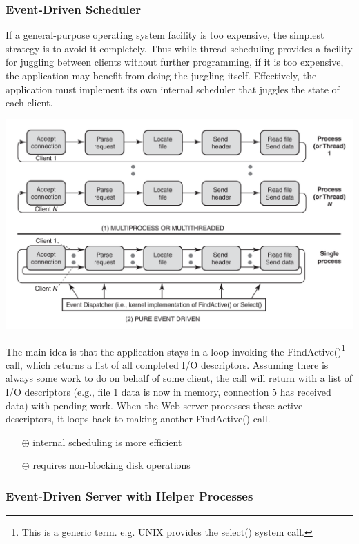 \subsubsection{Event-Driven Scheduler}

If a general-purpose operating system facility is too expensive, the simplest strategy is to avoid
it completely. Thus while thread scheduling provides a facility for juggling between clients
without further programming, if it is too expensive, the application may benefit from doing
the juggling itself. Effectively, the application must implement its own internal scheduler that
juggles the state of each client.

\begin{center}
\includegraphics[width=.7\textwidth]{images/chap6/multiprocess-event.png}
\end{center}

The main idea is that the application stays in a loop invoking the FindActive()\footnote{This is a generic term. e.g. UNIX provides the select() system call.} call, which returns a list of all completed I/O descriptors. Assuming there is always some work to do on behalf of some client, the call will return with a list of I/O descriptors (e.g., file 1 data is now in memory, connection 5 has received data) with pending work. When the Web server processes these active descriptors, it loops back to making another FindActive() call.

\begin{itemize}
\item[$\oplus$] internal scheduling is more efficient
\item[$\circleddash$] requires non-blocking disk operations
\end{itemize}


\subsubsection{Event-Driven Server with Helper Processes}


